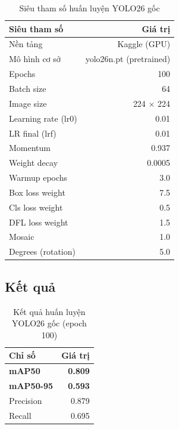 \begin{table}[H]
    \centering
    \caption{Siêu tham số huấn luyện YOLO26 gốc}
    \label{tab:hyperparams_ultra}
    \begin{tabular}{lr}
        \toprule
        \textbf{Siêu tham số} & \textbf{Giá trị} \\
        \midrule
        Nền tảng         & Kaggle (GPU) \\
        Mô hình cơ sở    & yolo26n.pt (pretrained) \\
        Epochs            & 100 \\
        Batch size        & 64 \\
        Image size        & 224 $\times$ 224 \\
        Learning rate (lr0) & 0.01 \\
        LR final (lrf)    & 0.01 \\
        Momentum          & 0.937 \\
        Weight decay      & 0.0005 \\
        Warmup epochs     & 3.0 \\
        Box loss weight   & 7.5 \\
        Cls loss weight   & 0.5 \\
        DFL loss weight   & 1.5 \\
        Mosaic            & 1.0 \\
        Degrees (rotation)& 5.0 \\
        \bottomrule
    \end{tabular}
\end{table}

\subsection{Kết quả}

\begin{table}[H]
    \centering
    \caption{Kết quả huấn luyện YOLO26 gốc (epoch 100)}
    \label{tab:results_ultra}
    \begin{tabular}{lr}
        \toprule
        \textbf{Chỉ số} & \textbf{Giá trị} \\
        \midrule
        \textbf{mAP50}      & \textbf{0.809} \\
        \textbf{mAP50-95}   & \textbf{0.593} \\
        Precision            & 0.879 \\
        Recall               & 0.695 \\
        \bottomrule
    \end{tabular}
\end{table}

